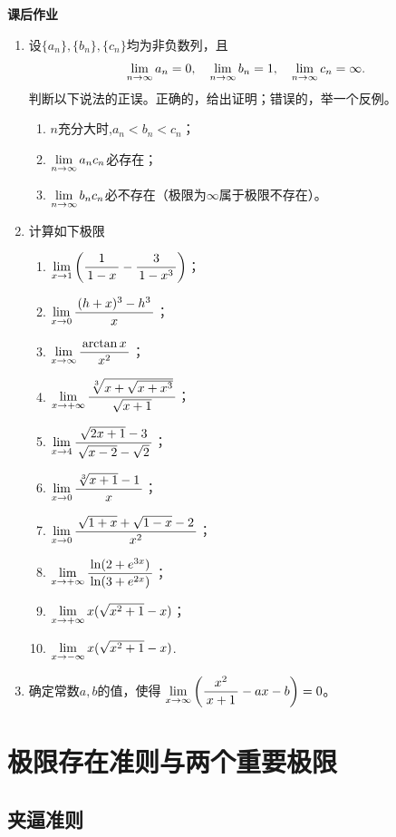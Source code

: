 \begin{ext}
	{\centering\bf 课后作业}
	
	\begin{enumerate}  
	  \item 设$\{a_n\},\{b_n\},\{c_n\}$均为非负数列，且
	  $$\lim\limits_{n\to\infty} a_n=0,\quad \lim\limits_{n\to\infty} b_n=1,\quad \lim\limits_{n\to\infty} c_n=\infty.$$
	  判断以下说法的正误。正确的，给出证明；错误的，举一个反例。
	  \begin{enumerate}[(1)]
	    \item $n$充分大时,$a_n<b_n<c_n$；
	    \item $\lim\limits_{n\to\infty} a_nc_n$必存在；
	    \item $\lim\limits_{n\to\infty} b_nc_n$必不存在（极限为$\infty$属于极限不存在）。
	  \end{enumerate}
	  \item 计算如下极限
	  \begin{enumerate}[(1)]
	    \item $\lim\limits_{x\to{1}}\left(\displaystyle\frac{\,{1}\,}{\,{1-x}\,}-\displaystyle\frac{\,{3}\,}{\,{1-x^3}\,}\right)$；
	    \item $\lim\limits_{x\to{0}}\displaystyle\frac{\,{(h+x)^3-h^3}\,}{\,{x}\,}$；
	    \item $\lim\limits_{x\to{\infty}}\displaystyle\frac{\,{\arctan x}\,}{\,{x^2}\,}$；
	    \item $\lim\limits_{x\to{+\infty}}\displaystyle\frac{\,{\sqrt[3]{x+\sqrt{x+x^3}}}\,}{\,{\sqrt{x+1}}\,}$；
	    \item $\lim\limits_{x\to{4}}\displaystyle\frac{\,{\sqrt{2x+1}-3}\,}{\,{\sqrt{x-2}-\sqrt2}\,}$；
	    \item $\lim\limits_{x\to{0}}\displaystyle\frac{\,{\sqrt[3]{x+1}-1}\,}{\,{x}\,}$；
	    \item $\lim\limits_{x\to{0}}\displaystyle\frac{\,{\sqrt{1+x}+\sqrt{1-x}-2}\,}{\,{x^2}\,}$；
	    \item $\lim\limits_{x\to{+\infty}}\displaystyle\frac{\,{\ln(2+e^{3x})}\,}{\,{\ln(3+e^{2x})}\,}$；
	    \item $\lim\limits_{x\to{+\infty}}x(\sqrt{x^2+1}-x)$；
	    \item $\lim\limits_{x\to{-\infty}}x(\sqrt{x^2+1}-x)$.
	  \end{enumerate}
	  \item 确定常数$a,b$的值，使得
	  $\lim\limits_{x\to{\infty}}\left(\displaystyle\frac{\,{x^2}\,}{\,{x+1}\,}-ax-b\right)=0$。
	\end{enumerate}
\end{ext}

\section{极限存在准则与两个重要极限}

\subsection{夹逼准则}

